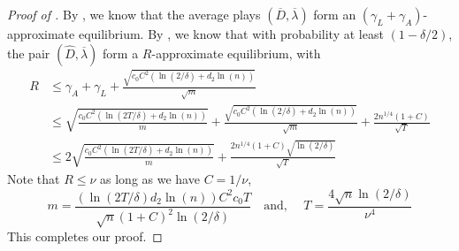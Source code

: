\begin{proof}[Proof of ]
  By , we know that the average plays
  $(\overline D, \overline \lambda)$ form an
  $(\gamma_L+\gamma_A)$-approximate equilibrium. By
  , we know that with probability at least
  $(1- \delta/2)$, the pair $(\hat D, \overline \lambda)$ form a
  $R$-approximate equilibrium, with
  \begin{align*}
    R &\leq \gamma_A + \gamma_L + \frac{\sqrt{c_0 C^2(\ln(2/\delta)
        +d_2\ln(n))}}{\sqrt{m}}\\
      & \leq  \sqrt{\frac{c_0 C^2 (\ln(2T/\delta) + d_2
        \ln(n))}{m}} 
        + \frac{\sqrt{c_0 C^2(\ln(2/\delta)
        +d_2\ln(n))}}{\sqrt{m}} + \frac{2 n^{1/4} {(1+C)}}{\sqrt{T}}\\
      & \leq 
        2\sqrt{\frac{c_0 C^2 (\ln(2T/\delta) + d_2
        \ln(n))}{m}}
        + \frac{2 n^{1/4} {(1+C)} \sqrt{\ln(2/\delta)}}{\sqrt{T}}
  \end{align*}
  Note that $R\leq \nu$ as long as we have $C = 1/\nu$,
  \[
    m = \frac{\left(\ln(2T/\delta)d_2\ln(n)\right) C^2 c_0 T}{\sqrt{n} (1+C)^2 \ln(2/\delta)}
 \quad
    \mbox{and, }\quad T = \frac{4\sqrt{n} \ln(2/\delta)}{\nu^4}
  \]
 This completes our proof.
\end{proof}

\fi

